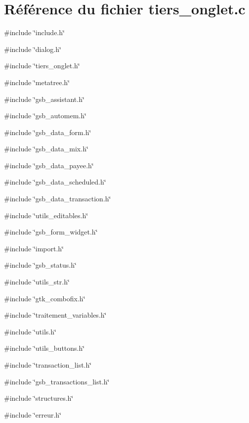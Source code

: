 \section{Référence du fichier tiers\_\-onglet.c}
\label{tiers__onglet_8c}
{\ttfamily \#include \char`\"{}include.h\char`\"{}}\par
{\ttfamily \#include \char`\"{}dialog.h\char`\"{}}\par
{\ttfamily \#include \char`\"{}tiers\_\-onglet.h\char`\"{}}\par
{\ttfamily \#include \char`\"{}metatree.h\char`\"{}}\par
{\ttfamily \#include \char`\"{}gsb\_\-assistant.h\char`\"{}}\par
{\ttfamily \#include \char`\"{}gsb\_\-automem.h\char`\"{}}\par
{\ttfamily \#include \char`\"{}gsb\_\-data\_\-form.h\char`\"{}}\par
{\ttfamily \#include \char`\"{}gsb\_\-data\_\-mix.h\char`\"{}}\par
{\ttfamily \#include \char`\"{}gsb\_\-data\_\-payee.h\char`\"{}}\par
{\ttfamily \#include \char`\"{}gsb\_\-data\_\-scheduled.h\char`\"{}}\par
{\ttfamily \#include \char`\"{}gsb\_\-data\_\-transaction.h\char`\"{}}\par
{\ttfamily \#include \char`\"{}utils\_\-editables.h\char`\"{}}\par
{\ttfamily \#include \char`\"{}gsb\_\-form\_\-widget.h\char`\"{}}\par
{\ttfamily \#include \char`\"{}import.h\char`\"{}}\par
{\ttfamily \#include \char`\"{}gsb\_\-status.h\char`\"{}}\par
{\ttfamily \#include \char`\"{}utils\_\-str.h\char`\"{}}\par
{\ttfamily \#include \char`\"{}gtk\_\-combofix.h\char`\"{}}\par
{\ttfamily \#include \char`\"{}traitement\_\-variables.h\char`\"{}}\par
{\ttfamily \#include \char`\"{}utils.h\char`\"{}}\par
{\ttfamily \#include \char`\"{}utils\_\-buttons.h\char`\"{}}\par
{\ttfamily \#include \char`\"{}transaction\_\-list.h\char`\"{}}\par
{\ttfamily \#include \char`\"{}gsb\_\-transactions\_\-list.h\char`\"{}}\par
{\ttfamily \#include \char`\"{}structures.h\char`\"{}}\par
{\ttfamily \#include \char`\"{}erreur.h\char`\"{}}\par
